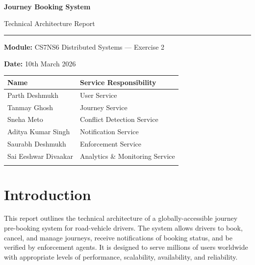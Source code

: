 \documentclass[12pt,a4paper]{article}
\begin{document}
\begin{titlepage}
  \centering
  \vspace*{2cm}
  {\LARGE\bfseries Journey Booking System\par}
  \vspace{0.4cm}
  {\Large Technical Architecture Report\par}
  \vspace{1.5cm}
  \rule{0.6\textwidth}{0.4pt}\par
  \vspace{0.8cm}
  {\large\textbf{Module:} CS7NS6 Distributed Systems --- Exercise 2\par}
  \vspace{0.3cm}
  {\large\textbf{Date:} 10th March 2026\par}
  \vspace{0.3cm}
  \vspace{2cm}

  \begin{tabular}{m{4.5cm} m{6cm}}
    \toprule
    \textbf{Name} & \textbf{Service Responsibility} \\
    \midrule
    Parth Deshmukh & User Service \\\addlinespace[0.4cm]
    Tanmay Ghosh & Journey Service  \\\addlinespace[0.4cm]
    Sneha Meto & Conflict Detection Service \\\addlinespace[0.4cm]
    Aditya Kumar Singh & Notification Service  \\\addlinespace[0.4cm]
    Saurabh Deshmukh & Enforcement Service  \\\addlinespace[0.4cm]
    Sai Eeshwar Divaakar & Analytics \& Monitoring Service \\\addlinespace[0.4cm]
    \bottomrule
  \end{tabular}
\end{titlepage} 

\tableofcontents

\section{Introduction}

This report outlines the technical architecture of a globally-accessible journey pre-booking system for road-vehicle drivers. The system allows drivers to book, cancel, and manage journeys, receive notifications of booking status, and be verified by enforcement agents. It is designed to serve millions of users worldwide with appropriate levels of performance, scalability, availability, and reliability.
\end{document}
